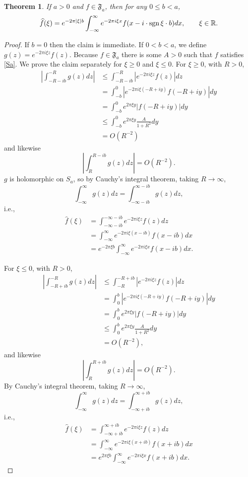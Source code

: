 \documentclass{article}
\newcommand{\sgn}{\ensuremath\mathrm{sgn}\,}
\newtheorem{theorem}{Theorem}
\theoremstyle{definition}
\begin{document}
\begin{theorem}
If $a>0$ and $f \in \mathfrak{F}_a$, then for any $0 \leq b < a$,
\[
\widehat{f}(\xi) = e^{-2\pi |\xi| b} \int_{-\infty}^\infty e^{-2\pi i\xi x} f(x-i\cdot  \sgn \xi \cdot b) dx,
\qquad \xi \in \mathbb{R}.
\]
\label{bleqa}
\end{theorem}
\begin{proof}
If $b=0$ then the claim is immediate. If $0<b<a$, 
we define $g(z)=e^{-2\pi i\xi z} f(z)$.
Because $f \in \mathfrak{F}_a$ there is some $A>0$ such that $f$ satisfies \eqref{Sa}. 
We
prove the claim separately for $\xi \geq 0$ and $\xi \leq 0$. 
For $\xi \geq 0$, with $R>0$,
\begin{align*}
\left| \int_{-R-ib}^{-R} g(z) dz \right|&\leq \int_{-R-ib}^{-R} |e^{-2\pi i\xi z} f(z)| dz\\
&=\int_{-b}^0 |e^{-2\pi i\xi(-R+iy)} f(-R+iy)| dy\\
&=\int_{-b}^0 e^{2\pi \xi y} |f(-R+iy)| dy\\
&\leq \int_{-b}^0 e^{2\pi \xi y} \frac{A}{1+R^2} dy\\
&=O(R^{-2})
\end{align*}
and likewise
\[
\left| \int_{R}^{R-ib} g(z) dz \right|=O(R^{-2}).
\]
$g$ is holomorphic on $S_a$, so by Cauchy's integral theorem, taking $R \to \infty$,
\[
\int_{-\infty}^\infty g(z) dz=
\int_{-\infty-ib}^{\infty-ib} g(z) dz,
\]
i.e.,
\begin{align*}
\widehat{f}(\xi)&=\int_{-\infty-ib}^{-\infty-ib} e^{-2\pi i\xi z} f(z)dz\\
&=\int_{-\infty}^\infty e^{-2\pi i\xi(x-ib)} f(x-ib) dx\\
&=e^{-2\pi \xi b} \int_{-\infty}^\infty e^{-2\pi i\xi x} f(x-ib) dx.
\end{align*}

For $\xi \leq 0$, with $R>0$,
\begin{align*}
\left| \int_{-R+ib}^{-R} g(z) dz \right|&\leq
\int_{-R}^{-R+ib}  |e^{-2\pi i\xi z} f(z)| dz\\
&=\int_{0}^{b} |e^{-2\pi i\xi(-R+iy)} f(-R+iy)| dy\\
&=\int_0^b e^{2\pi \xi y} |f(-R+iy)| dy\\
&\leq \int_0^b e^{2\pi \xi y} \frac{A}{1+R^2} dy\\
&=O(R^{-2}),
\end{align*}
and likewise
\[
\left| \int_{R}^{R+ib} g(z) dz \right|=O(R^{-2}).
\]
By Cauchy's integral theorem, taking $R \to \infty$,
\[
\int_{-\infty}^\infty g(z) dz = \int_{-\infty+ib}^{\infty+ib} g(z) dz,
\]
i.e.,
\begin{align*}
\widehat{f}(\xi)&= \int_{-\infty+ib}^{\infty+ib} e^{-2\pi i\xi z} f(z) dz\\
&=\int_{-\infty}^\infty e^{-2\pi i\xi(x+ib)} f(x+ib) dx\\
&=e^{2\pi \xi b} \int_{-\infty}^\infty e^{-2\pi i\xi x} f(x+ib) dx.
\end{align*}
\end{proof}
\end{document}
